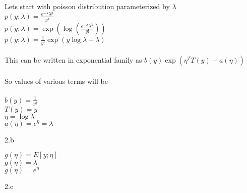\begin{answer}
  Lets start with poisson distribution parameterized by $\lambda$ \\
  $ p(y; \lambda) = \frac{e^{-\lambda}\lambda^y}{y!} $ \\
  $ p(y; \lambda) = \exp(\log(\frac{e^{-\lambda}\lambda^y}{y!})) $ \\
  $ p(y; \lambda) = \frac{1}{y!} \exp(y \log\lambda -\lambda )$ \\ \\
  This can be written in exponential family as $ b(y) \exp(\eta^TT(y)-a(\eta)) $ \\ \\
  So values of various terms will be \\ \\  $b(y) = \frac{1}{y!} $ \\
  $T(y) = y $ \\
  $ \eta = \log\lambda$ \\
  $ a(\eta) = e^\eta =\lambda$ \\
\end{answer}
\clearpage

\LARGE
2.b
\normalsize

\begin{answer}
 $  g(\eta) = E[y;\eta] $ \\ 
 $  g(\eta) = \lambda $ \\ 
 $  g(\eta) = e^\eta $ \\ 
\end{answer}
\clearpage

\LARGE
2.c
\normalsize

